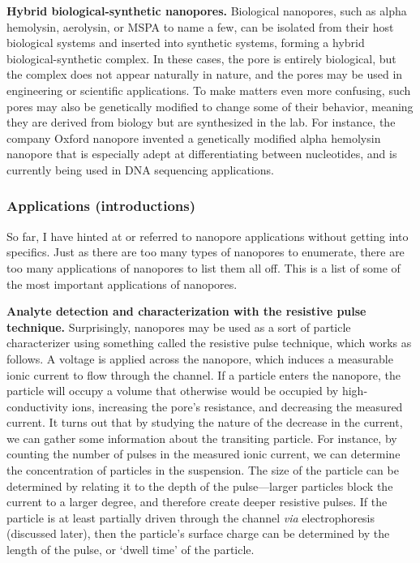 \documentclass[a4paper,10pt]{article}
\theoremstyle{definition}
\theoremstyle{remark}
\begin{document}
\textbf{Hybrid biological-synthetic nanopores.} Biological nanopores, such as alpha hemolysin, aerolysin, or MSPA to name a few, can be isolated from their host biological systems and inserted into synthetic systems, forming a hybrid biological-synthetic complex. In these cases, the pore is entirely biological, but the complex does not appear naturally in nature, and the pores may be used in engineering or scientific applications. To make matters even more confusing, such pores may also be genetically modified to change some of their behavior, meaning they are derived from biology but are synthesized in the lab. For instance, the company Oxford nanopore invented a genetically modified alpha hemolysin nanopore that is especially adept at differentiating between nucleotides, and is currently being used in DNA sequencing applications.

\subsubsection{Applications (introductions)}

So far, I have hinted at or referred to nanopore applications without getting into specifics. Just as there are too many types of nanopores to enumerate, there are too many applications of nanopores to list them all off. This is a list of some of the most important applications of nanopores.

\textbf{Analyte detection and characterization with the resistive pulse technique.} Surprisingly, nanopores may be used as a sort of particle characterizer using something called the resistive pulse technique, which works as follows. A voltage is applied across the nanopore, which induces a measurable ionic current to flow through the channel. If a particle enters the nanopore, the particle will occupy a volume that otherwise would be occupied by high-conductivity ions, increasing the pore's resistance, and decreasing the measured current. It turns out that by studying the nature of the decrease in the current, we can gather some information about the transiting particle. For instance, by counting the number of pulses in the measured ionic current, we can determine the concentration of particles in the suspension. The size of the particle can be determined by relating it to the depth of the pulse---larger particles block the current to a larger degree, and therefore create deeper resistive pulses. If the particle is at least partially driven through the channel \textit{via} electrophoresis (discussed later), then the particle's surface charge can be determined by the length of the pulse, or `dwell time' of the particle.
\end{document}
